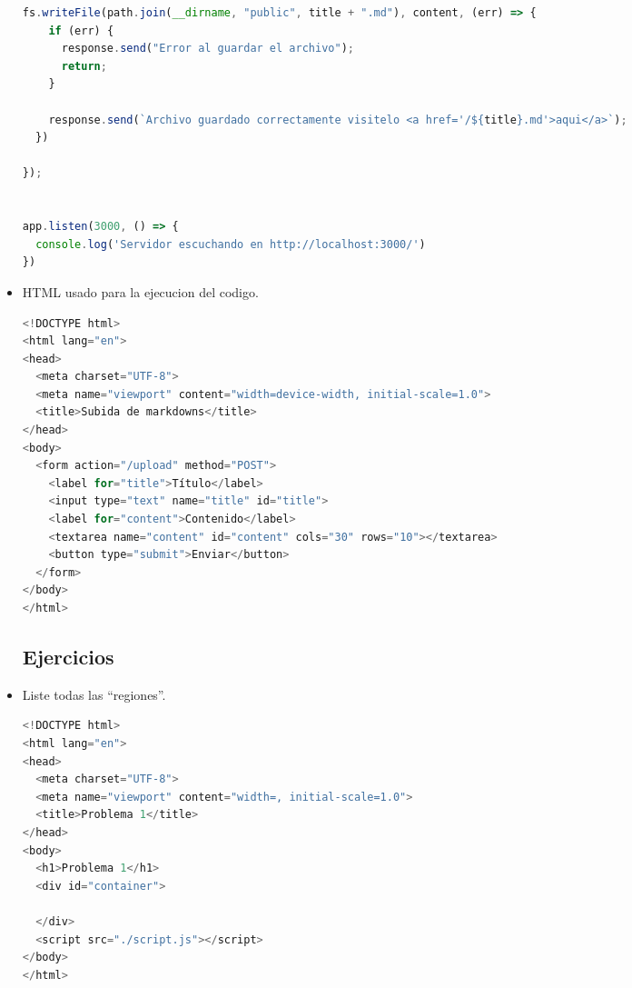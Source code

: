 \documentclass{article}
\begin{document}
\begin{itemize}
\begin{lstlisting}[language=JavaScript, caption=EJERCICIOS PROPUESTOS]
  fs.writeFile(path.join(__dirname, "public", title + ".md"), content, (err) => {
    if (err) {
      response.send("Error al guardar el archivo");
      return;
    }

    response.send(`Archivo guardado correctamente visitelo <a href='/${title}.md'>aqui</a>`);
  })

});


app.listen(3000, () => {
  console.log('Servidor escuchando en http://localhost:3000/')
})


            \end{lstlisting}            
            \item HTML usado para la ejecucion del codigo.
            
            \begin{lstlisting}[language=JavaScript, caption=HTML PARA LOS EJERCICIOS PROPUIESTOS ]
<!DOCTYPE html>
<html lang="en">
<head>
  <meta charset="UTF-8">
  <meta name="viewport" content="width=device-width, initial-scale=1.0">
  <title>Subida de markdowns</title>
</head>
<body>
  <form action="/upload" method="POST">
    <label for="title">Título</label>
    <input type="text" name="title" id="title">
    <label for="content">Contenido</label>
    <textarea name="content" id="content" cols="30" rows="10"></textarea>
    <button type="submit">Enviar</button>
  </form>
</body>
</html>

            \end{lstlisting} 
            
            \newline \newline \newline
        
            \subsection{Ejercicios}
            
            \item Liste todas las “regiones”.

            \begin{lstlisting}[language=JavaScript, caption=PROBLEMA1-INDEX]
            <!DOCTYPE html>
<html lang="en">
<head>
  <meta charset="UTF-8">
  <meta name="viewport" content="width=, initial-scale=1.0">
  <title>Problema 1</title>
</head>
<body>
  <h1>Problema 1</h1>
  <div id="container">

  </div>
  <script src="./script.js"></script>
</body>
</html>
            \end{lstlisting}  


\end{itemize}
\end{document}
